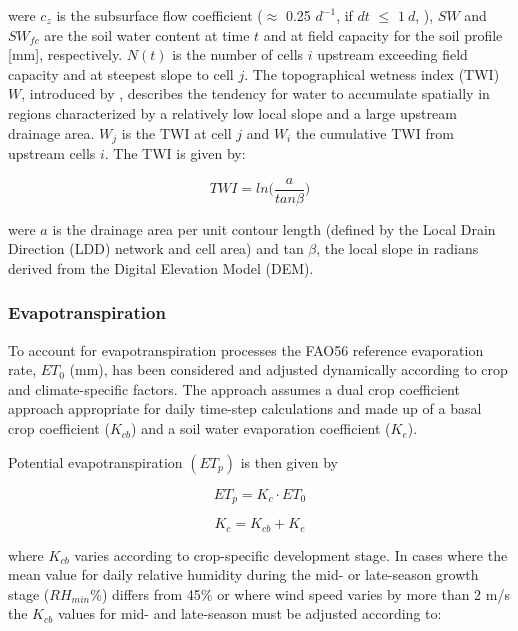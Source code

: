 \documentclass[]{article}
\begin{document}
were \(c_z\) is the subsurface flow coefficient (\(\approx\) 0.25
\(d^{-1}\), if \(dt\) \(\leq\) \(1~d\), \citep{Manfreda2005}), \(SW\)
and \(SW_{fc}\) are the soil water content at time \(t\) and at field
capacity for the soil profile {[}mm{]}, respectively. \(N(t)\) is the
number of cells \(i\) upstream exceeding field capacity and at steepest
slope to cell \(j\). The topographical wetness index (TWI) \(W\),
introduced by \cite{Beven1979}, describes the tendency for water to
accumulate spatially in regions characterized by a relatively low local
slope and a large upstream drainage area. \(W_j\) is the TWI at cell
\(j\) and \(W_i\) the cumulative TWI from upstream cells \(i\). The TWI
is given by:

\begin{equation}
TWI =ln\Big(\frac{a}{tan \beta} \Big)
\label{eq:Wz}  
\end{equation}

were \(a\) is the drainage area per unit contour length (defined by the
Local Drain Direction (LDD) network and cell area) and tan \(\beta\),
the local slope in radians derived from the Digital Elevation Model
(DEM).

\subsubsection{Evapotranspiration}\label{evapotranspiration}

To account for evapotranspiration processes the FAO56 reference
evaporation rate, \(ET_0\) (mm), has been considered and adjusted
dynamically according to crop and climate-specific factors. The approach
assumes a dual crop coefficient approach appropriate for daily time-step
calculations \citep{Allen1998} and made up of a basal crop coefficient
(\(K_{cb}\)) and a soil water evaporation coefficient (\(K_e\)).

Potential evapotranspiration \((ET_p)\) is then given by

\begin{equation}
ET_p=K_c \cdot ET_0
\label{eq:ETp}  
\end{equation}

\begin{equation}
K_c = K_{cb} + K_e
\label{eq:Kc}  
\end{equation}

where \(K_{cb}\) varies according to crop-specific development stage. In
cases where the mean value for daily relative humidity during the mid-
or late-season growth stage (\(RH_{min}\)\%) differs from 45\% or where
wind speed varies by more than 2 m/s the \(K_{cb}\) values for mid- and
late-season must be adjusted according to:
\end{document}
